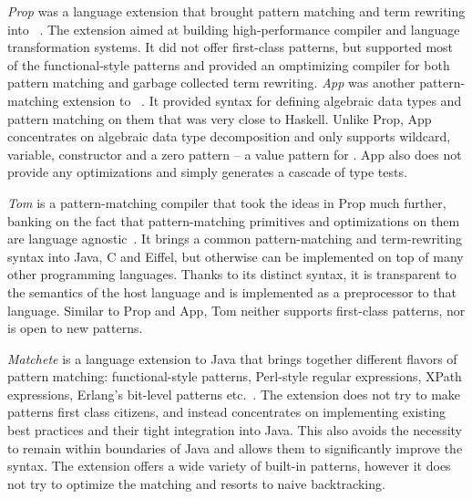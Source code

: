 \emph{Prop} was a language extension that brought pattern matching and term 
rewriting into \Cpp{}~\cite{Prop96}. The extension aimed at building 
high-performance compiler and language transformation systems. It did not offer 
first-class patterns, but supported most of the functional-style patterns and 
provided an omptimizing compiler for both pattern matching and garbage collected 
term rewriting. \emph{App} was another pattern-matching extension to \Cpp{}~\cite{App}. 
It provided syntax for defining algebraic data types and pattern matching on 
them that was very close to Haskell. Unlike Prop, App concentrates on algebraic 
data type decomposition and only supports wildcard, variable, constructor and a 
zero pattern -- a value pattern for . App also does not provide 
any optimizations and simply generates a cascade of type tests.

\emph{Tom} is a pattern-matching compiler that took the ideas in Prop much 
further, banking on the fact that pattern-matching primitives and optimizations 
on them are language agnostic~\cite{Moreau:2003}. It brings a common 
pattern-matching and term-rewriting syntax into Java, C and Eiffel, but 
otherwise can be implemented on top of many other programming languages. Thanks 
to its distinct syntax, it is transparent to the semantics of the host language 
and is implemented as a preprocessor to that language. Similar to Prop and App, 
Tom neither supports first-class patterns, nor is open to new patterns. 

\emph{Matchete} is a language extension to Java that brings together different flavors 
of pattern matching: functional-style patterns, Perl-style regular expressions, 
XPath expressions, Erlang's bit-level patterns etc.~\cite{padl08}. The extension 
does not try to make patterns first class citizens, and instead concentrates on 
implementing existing best practices and their tight integration into Java. This 
also avoids the necessity to remain within boundaries of Java and allows them to 
significantly improve the syntax. The extension offers a wide variety of 
built-in patterns, however it does not try to optimize the matching and resorts 
to naive backtracking. 

